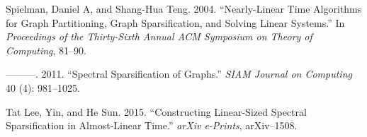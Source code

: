 \documentclass[
  letterpaper,
  DIV=11,
  numbers=noendperiod]{scrartcl}
\newlength{\cslhangindent}
\newlength{\cslentryspacingunit} %
\newenvironment{CSLReferences}[2] %
 {%
  \setlength{\parindent}{0pt}
  \ifodd #1
  \let\oldpar\par
  \def\par{\hangindent=\cslhangindent\oldpar}
  \fi
  \setlength{\parskip}{#2\cslentryspacingunit}
 }%
 {}
\theoremstyle{plain}
\theoremstyle{plain}
\theoremstyle{plain}
\theoremstyle{definition}
\theoremstyle{plain}
\theoremstyle{remark}
\begin{document}
\begin{CSLReferences}{1}{0}
\leavevmode{}%
Spielman, Daniel A, and Shang-Hua Teng. 2004. {``Nearly-Linear Time
Algorithms for Graph Partitioning, Graph Sparsification, and Solving
Linear Systems.''} In \emph{Proceedings of the Thirty-Sixth Annual ACM
Symposium on Theory of Computing}, 81--90.

\leavevmode{}%
---------. 2011. {``Spectral Sparsification of Graphs.''} \emph{SIAM
Journal on Computing} 40 (4): 981--1025.

\leavevmode{}%
Tat Lee, Yin, and He Sun. 2015. {``Constructing Linear-Sized Spectral
Sparsification in Almost-Linear Time.''} \emph{arXiv e-Prints},
arXiv--1508.

\end{CSLReferences}
\end{document}
